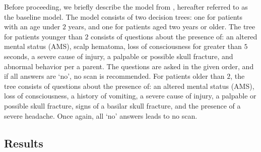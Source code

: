 \documentclass[11pt, letterpaper]{amsart}
\let\Oldsubsection\subsection
\renewcommand{\subsection}{\FloatBarrier\Oldsubsection}
\begin{document}
Before proceeding, we briefly describe the model from \cite{kuppermann2009identification}, hereafter referred to as the baseline model. The model consists of two decision trees: one for patients with an age under $2$ years, and one for patients aged two years or older. The tree for patients younger than $2$ consists of questions about the presence of: an altered mental status (AMS), scalp hematoma, loss of consciousness for greater than $5$ seconds, a severe cause of injury, a palpable or possible skull fracture, and abnormal behavior per a parent. The questions are asked in the given order, and if all answers are `no', no scan is recommended. For patients older than $2$, the tree consists of questions about the presence of: an altered mental status (AMS), loss of consciousness, a history of vomiting, a severe cause of injury, a palpable or possible skull fracture, signs of a basilar skull fracture, and the presence of a severe headache. Once again, all `no' answers leads to no scan. 

\subsection{Results} \label{ssec:results}
\end{document}
